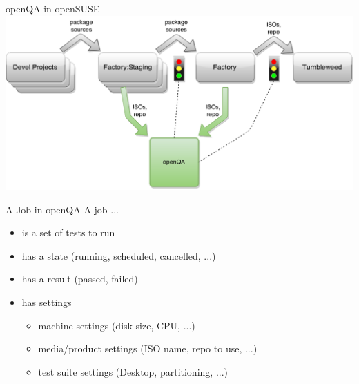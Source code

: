\documentclass[
]{beamer}
\begin{document}
\begin{frame}{openQA in openSUSE}
  \includegraphics[width=.8\paperwidth]{openqa_in_devel_workflow}
\end{frame}


\begin{frame}{A Job in openQA}
  A job ...
  \begin{itemize}
    \item is a set of tests to run
    \item has a state (running, scheduled, cancelled, ...)
    \item has a result (passed, failed)
    \item has settings
    \begin{itemize}
      \item machine settings (disk size, CPU, ...)
      \item media/product settings (ISO name, repo to use, ...)
      \item test suite settings (Desktop, partitioning, ...)
    \end{itemize}
  \end{itemize}
\end{frame}
\end{document}
